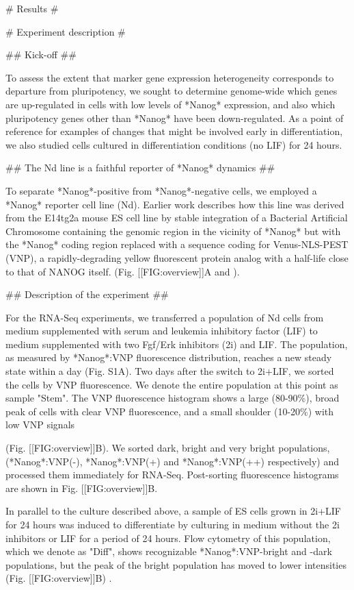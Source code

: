 \documentclass[aps,prl,twocolumn,superscriptaddress]{revtex4}
\begin{document}
# Results #


# Experiment description #

## Kick-off ##

To assess the extent that marker gene expression heterogeneity corresponds to departure from pluripotency, we sought to determine genome-wide which genes are up-regulated in cells with low levels of *Nanog* expression, and also which pluripotency genes other than *Nanog* have been down-regulated. As a point of reference for examples of changes that might be involved early in differentiation, we also studied cells cultured in differentiation conditions (no LIF) for 24 hours. 


## The Nd line is a faithful reporter of *Nanog* dynamics ##

To separate *Nanog*-positive from *Nanog*-negative cells, we employed a *Nanog* reporter cell line (Nd). Earlier work describes how this line was  derived from the E14tg2a mouse ES cell line by stable integration of a Bacterial Artificial Chromosome containing the genomic region in the vicinity of *Nanog* but with the *Nanog* coding region replaced with a sequence coding for Venus-NLS-PEST (VNP), a rapidly-degrading yellow fluorescent protein analog with a half-life close to that of NANOG itself. (Fig. [[FIG:overview]]A and \citet{AbranchesPlosONE13}). 


## Description of the experiment ##

For the RNA-Seq experiments, we transferred a population of Nd cells from medium supplemented with serum and leukemia inhibitory factor (LIF) to medium supplemented with two Fgf/Erk inhibitors (2i) and LIF. The population, as measured by *Nanog*:VNP fluorescence distribution, reaches a new steady state within a day (Fig. S1A). Two days after the switch to 2i+LIF,  we sorted the cells by VNP fluorescence. We denote the entire population at this point as sample "Stem". The VNP fluorescence histogram shows a large (80-90\%), broad peak of cells with clear VNP fluorescence, and a small shoulder (10-20\%) with low VNP signals 

(Fig. [[FIG:overview]]B). We sorted dark, bright and very bright populations, (*Nanog*:VNP(-), *Nanog*:VNP(+) and *Nanog*:VNP(++) respectively) and processed them immediately for RNA-Seq. Post-sorting fluorescence histograms are shown in Fig. [[FIG:overview]]B.

In parallel to the culture described above, a sample of ES cells grown in 2i+LIF for 24 hours was induced to differentiate by culturing in medium without the 2i inhibitors or LIF for a period of 24 hours. Flow cytometry of this population, which we denote as "Diff",  shows recognizable *Nanog*:VNP-bright and -dark populations, but the peak of the bright population has moved to lower intensities (Fig. [[FIG:overview]]B) . 
\end{document}
